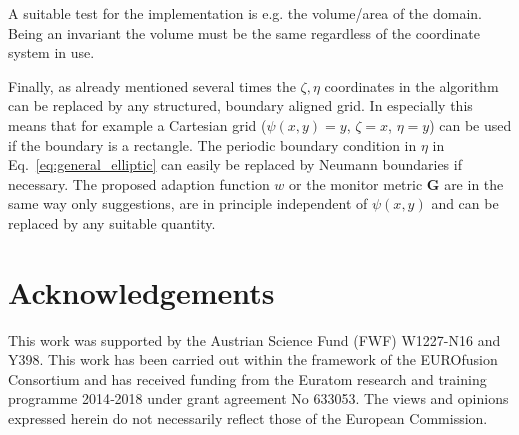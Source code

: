 \documentclass{hitec} %
\newcommand{\eps}{\varepsilon}
\renewcommand{\vec}[1]{{\mathbf{#1}}}
\begin{document}
A suitable test for the implementation is e.g. the volume/area of the domain. 
Being an invariant
the volume must be the same regardless of the coordinate system in use. 

Finally, as already mentioned several times the $\zeta,\eta$ coordinates in the algorithm can 
be replaced by any structured, boundary aligned grid. In especially this means
that for example a Cartesian grid ($\psi(x,y) = y$, $\zeta=x$, $\eta=y$) 
can be used if the boundary 
is a rectangle. The periodic boundary condition in $\eta$ in Eq.~\eqref{eq:general_elliptic} can easily be replaced 
by Neumann boundaries if necessary. 
The proposed adaption function $w$ or the monitor metric $\vec G$
are in the same way only suggestions, are in principle independent of $\psi(x,y)$ and can be replaced by any suitable quantity. 








\section*{Acknowledgements} 	
This work was supported by the Austrian Science Fund (FWF) W1227-N16 and Y398. 
This work has been carried out within the framework of the EUROfusion Consortium and has received funding from the Euratom research and training programme 2014‐2018 under grant agreement No 633053. The views and opinions expressed herein do not necessarily reflect those of the European Commission.




\end{document}
